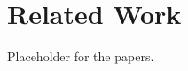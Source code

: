 \section{Related Work}
\label{sec:related}

Placeholder for the papers.
\cite{thiagarajan:mobbat}

\cite{balasubramanian:encon}

\cite{vallina-rod:ads}

\cite{falaki:mobileusage}